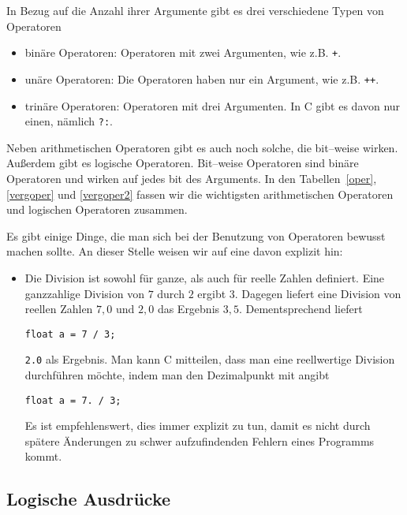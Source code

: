 In Bezug auf die Anzahl ihrer Argumente gibt es drei verschiedene Typen von Operatoren
\begin{itemize}
\item binäre Operatoren: Operatoren mit zwei Argumenten, wie z.B. \verb|+|.
\item unäre Operatoren: Die Operatoren haben nur ein Argument, wie z.B. \verb|++|.
\item trinäre Operatoren: Operatoren mit drei Argumenten. In C gibt es davon nur einen, nämlich \verb|?:|.\index{\texttt{\?:}}
\end{itemize} 
Neben arithmetischen Operatoren gibt es auch noch solche, die bit--weise wirken. 
Außerdem gibt es logische Operatoren.
Bit--weise Operatoren sind binäre Operatoren und wirken auf jedes bit des Arguments.
In den Tabellen~\ref{oper}, \ref{vergoper} und \ref{vergoper2} fassen wir die wichtigsten arithmetischen Operatoren und logischen Operatoren zusammen.

Es gibt einige Dinge, die man sich bei der Benutzung von Operatoren bewusst machen sollte.
An dieser Stelle weisen wir auf eine davon explizit hin:
\begin{itemize}
\item Die Division ist sowohl für ganze, als auch für reelle Zahlen definiert. 
  Eine ganzzahlige Division von $7$ durch $2$ ergibt $3$.
  Dagegen liefert eine Division von reellen Zahlen $7{,}0$ und $2{,}0$ das Ergebnis $3{,}5$.
  Dementsprechend liefert
\begin{lstlisting}
float a = 7 / 3;
\end{lstlisting}
  \verb|2.0| als Ergebnis. 
  Man kann C mitteilen, dass man eine reellwertige Division durchführen möchte, indem man den Dezimalpunkt mit angibt
\begin{lstlisting}
float a = 7. / 3;
\end{lstlisting}
Es ist empfehlenswert, dies immer explizit zu tun, damit es nicht durch spätere Änderungen zu schwer aufzufindenden Fehlern eines Programms kommt.
\end{itemize}

\subsection{Logische Ausdrücke}

